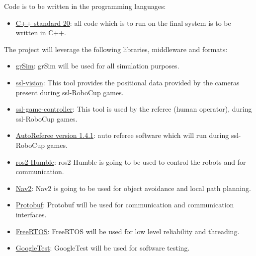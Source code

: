 Code is to be written in the programming languages:
\begin{itemize}
    \item \href{https://en.cppreference.com/w/cpp/20}{C++ standard 20}: all code which is to run on the final system is to be written in C++.
\end{itemize}  

The project will leverage the following libraries, middleware and formats:
\begin{itemize}
    \item \href{https://github.com/RoboCup-SSL/grSim}{grSim}: grSim will be used for all simulation purposes.
    \item \href{https://github.com/RoboCup-SSL/ssl-vision}{ssl-vision}: This tool provides the positional data provided by the cameras present during \ac{ssl}-RoboCup games.
    \item \href{https://github.com/RoboCup-SSL/ssl-game-controller}{ssl-game-controller}: This tool is used by the referee (human operator), during \ac{ssl}-RoboCup games.
    \item \href{https://github.com/TIGERs-Mannheim/AutoReferee}{AutoReferee version 1.4.1}: auto referee software which will run during \ac{ssl}-RoboCup games.
    \item \href{https://docs.ros.org/en/humble/index.html}{\ac{ros2} Humble}: \ac{ros2} Humble is going to be used to control the robots and for communication.
    \item \href{https://docs.nav2.org/index.html}{Nav2}: Nav2 is going to be used for object avoidance and local path planning.
    \item \href{https://github.com/protocolbuffers/protobuf}{Protobuf}: Protobuf will be used for communication and communication interfaces.
    \item \href{https://freertos.org/}{FreeRTOS}: FreeRTOS will be used for low level reliability and threading.
    \item \href{https://google.github.io/googletest/}{GoogleTest}: GoogleTest will be used for software testing.
\end{itemize}

